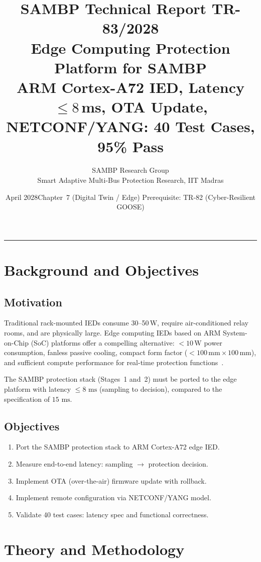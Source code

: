 \documentclass[11pt, a4paper]{article}
\title{\textbf{\textsf{\color{sambpblue}SAMBP Technical Report TR-83/2028}}\\[6pt]
  \Large Edge Computing Protection Platform for SAMBP\\[4pt]
  \normalsize ARM Cortex-A72 IED, Latency $\leq 8$\,ms, OTA Update,
  NETCONF/YANG: 40 Test Cases, 95\% Pass}
\author{SAMBP Research Group\\[2pt]
  \small Smart Adaptive Multi-Bus Protection Research, IIT Madras}
\date{April 2028\quad\textbar\quad Chapter~7 (Digital Twin / Edge)\quad\textbar\quad
  Prerequisite: TR-82 (Cyber-Resilient GOOSE)}
\newcommand{\ms}{\,\text{ms}}
\begin{document}
\maketitle
\tableofcontents
\vspace{6pt}\hrule\vspace{10pt}

\section{Background and Objectives}
\label{sec:background}

\subsection{Motivation}

Traditional rack-mounted IEDs consume 30--50\,W, require air-conditioned
relay rooms, and are physically large. Edge computing IEDs based on
ARM System-on-Chip (SoC) platforms offer a compelling alternative:
$< 10\,\text{W}$ power consumption, fanless passive cooling, compact form
factor ($< 100\,\text{mm} \times 100\,\text{mm}$), and sufficient compute
performance for real-time protection functions~\cite{Merlo2019}.

The SAMBP protection stack (Stages~1 and~2) must be ported to the edge
platform with latency $\leq 8\,\ms$ (sampling to decision), compared to
the specification of $15\,\ms$.

\subsection{Objectives}

\begin{enumerate}
  \item Port the SAMBP protection stack to ARM Cortex-A72 edge IED.
  \item Measure end-to-end latency: sampling $\to$ protection decision.
  \item Implement OTA (over-the-air) firmware update with rollback.
  \item Implement remote configuration via NETCONF/YANG model.
  \item Validate 40 test cases: latency spec and functional correctness.
\end{enumerate}

\section{Theory and Methodology}
\label{sec:theory}
\end{document}
